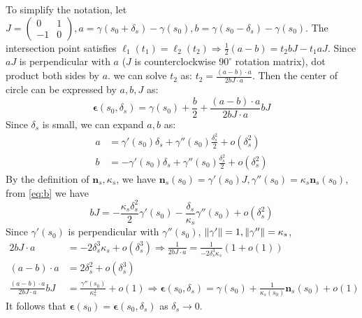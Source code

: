 \documentclass{article}
\DeclarePairedDelimiter\norm{\lVert}{\rVert}
\begin{document}
\begin{enumerate}
\begin{solution}
To simplify the notation, let $J=\begin{pmatrix}0 & 1 \\ -1 & 0\end{pmatrix},a=\gamma(s_0+\delta_s)-\gamma(s_0),b=\gamma(s_0-\delta_s)-\gamma(s_0)$.
The intersection point satisfies $\ell_1(t_1)=\ell_2(t_2) \Rightarrow \frac{1}{2}(a-b)=t_2bJ-t_1aJ$.
Since $aJ$ is perpendicular with $a$ ($J$ is counterclockwise $90^\circ$ rotation matrix), dot product both sides by $a$. we can solve $t_2$ as:
$t_2=\frac{(a-b)\cdot a}{2bJ\cdot a}$.
Then the center of circle can be expressed by $a,b,J$ as:
$$
\bm{\epsilon}(s_0,\delta_s)=\gamma(s_0)+\frac{b}{2}+\frac{(a-b)\cdot a}{2bJ\cdot a} bJ
$$
Since $\delta_s$ is small, we can expand $a,b$ as:
\begin{subequations}
\begin{align}
\label{eq:a}a & = \gamma'(s_0) \delta_s + \gamma''(s_0)\frac{\delta_s^2}{2} +o(\delta_s^2)\\
\label{eq:b}b & = -\gamma'(s_0) \delta_s + \gamma''(s_0)\frac{\delta_s^2}{2} +o(\delta_s^2)
\end{align}
\end{subequations}
By the definition of $\bm{n}_s,\kappa_s$, we have $\bm{n}_s(s_0) =\gamma'(s_0)J,\gamma''(s_0)=\kappa_s \bm{n}_s(s_0)$, from \eqref{eq:b} we have
\begin{equation}
bJ = -\frac{\kappa_s \delta_s^2}{2} \gamma'(s_0) -\frac{\delta_s}{\kappa_s}\gamma''(s_0)+ o(\delta_s^2) 
\end{equation}
Since $\gamma'(s_0)$ is perpendicular with $\gamma''(s_0)$, $\norm{\gamma'} = 1, \norm{\gamma''} = \kappa_s$,
\begin{align*}
2bJ\cdot a & = -2\delta_s^3 \kappa_s + o(\delta_s^3) \Rightarrow \frac{1}{2bJ\cdot a} =\frac{1}{-2\delta_s^3 \kappa_s}(1+o(1)) \\
(a-b)\cdot a & = 2\delta_s^2 + o(\delta_s^3) \\
\frac{(a-b)\cdot a }{2bJ\cdot a}bJ & = \frac{\gamma''(s_0)}{\kappa^2_s}+o(1) \Rightarrow \bm{\epsilon}(s_0,\delta_s)=\gamma(s_0)+\frac{1}{\kappa_s(s_0)}\bm{n}_s(s_0) + o(1)
\end{align*}
It follows that $\bm{\epsilon}(s_0)=\bm{\epsilon}(s_0,\delta_s)$ as $\delta_s\to 0$.
\end{solution}
\end{enumerate}
\end{document}
